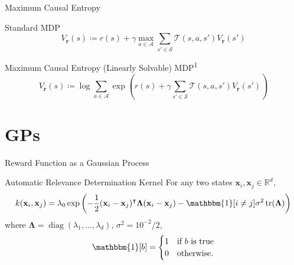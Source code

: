 \documentclass{beamer}
\DeclareMathOperator{\diag}{diag}
\DeclareMathOperator{\tr}{tr}
\begin{document}
\begin{frame}{Maximum Causal Entropy}
  \begin{minipage}[t]{\textwidth}
    \begin{block}{Standard MDP}
      \[
        V_{\mathbf{r}}(s) \coloneqq r(s) + \gamma \max_{a \in \mathcal{A}}
        \sum_{s' \in \mathcal{S}} \mathcal{T}(s, a, s')V_{\mathbf{r}}(s')
      \]
    \end{block}
    \begin{block}{Maximum Causal Entropy (Linearly Solvable) MDP\textsuperscript{1}}
      \[
        V_{\mathbf{r}}(s) \coloneqq \log \sum_{a \in \mathcal{A}} \exp \left(
          r(s) + \gamma\sum_{s' \in \mathcal{S}} \mathcal{T}(s, a,
          s')V_{\mathbf{r}}(s') \right)
      \]
    \end{block}
    \vspace{1cm}
  \end{minipage}
\end{frame}

\section{GPs}

\begin{frame}{Reward Function as a Gaussian Process}
  \begin{block}{Automatic Relevance Determination Kernel}
    For any two states $\mathbf{x}_i, \mathbf{x}_j \in \mathbb{R}^d$,
    \[
      k(\mathbf{x}_i, \mathbf{x}_j) = \lambda_0\exp\left(
        -\frac{1}{2}(\mathbf{x}_i - \mathbf{x}_j)^\intercal\bm\Lambda(\mathbf{x}_i -
        \mathbf{x}_j) - \mathbbm{1}[i \ne j]\sigma^2\tr(\bm\Lambda) \right)
    \]
    where $\bm\Lambda = \diag(\lambda_1, \dots, \lambda_d)$, $\sigma^2 =
    10^{-2}/2$,
    \[
      \mathbbm{1}[b] = \begin{cases}
        1 & \mbox{if $b$ is true} \\
        0 & \mbox{otherwise}.
      \end{cases}
    \]
  \end{block}
\end{frame}
\end{document}
